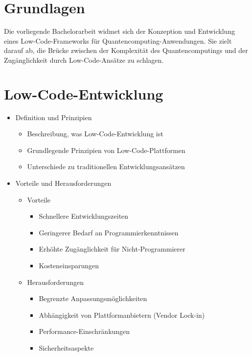 \section{Grundlagen}
Die vorliegende Bachelorarbeit widmet sich der Konzeption und Entwicklung eines 
Low-Code-Frameworks für Quantencomputing-Anwendungen. Sie zielt darauf ab, die 
Brücke zwischen der Komplexität des Quantencomputings und der Zugänglichkeit durch 
Low-Code-Ansätze zu schlagen. 

\section{Low-Code-Entwicklung}
\begin{itemize}
    \item Definition und Prinzipien
        \begin{itemize}
            \item Beschreibung, was Low-Code-Entwicklung ist
            \item Grundlegende Prinzipien von Low-Code-Plattformen
            \item Unterschiede zu traditionellen Entwicklungsansätzen
        \end{itemize}
    \item Vorteile und Herausforderungen
        \begin{itemize}
            \item Vorteile
                \begin{itemize}
                    \item Schnellere Entwicklungszeiten
                    \item Geringerer Bedarf an Programmierkenntnissen
                    \item Erhöhte Zugänglichkeit für Nicht-Programmierer
                    \item Kosteneinsparungen
                \end{itemize}
            \item Herausforderungen
                \begin{itemize}
                    \item Begrenzte Anpassungsmöglichkeiten
                    \item Abhängigkeit von Plattformanbietern (Vendor Lock-in)
                    \item Performance-Einschränkungen
                    \item Sicherheitsaspekte
                \end{itemize}
        \end{itemize}
\end{itemize}

